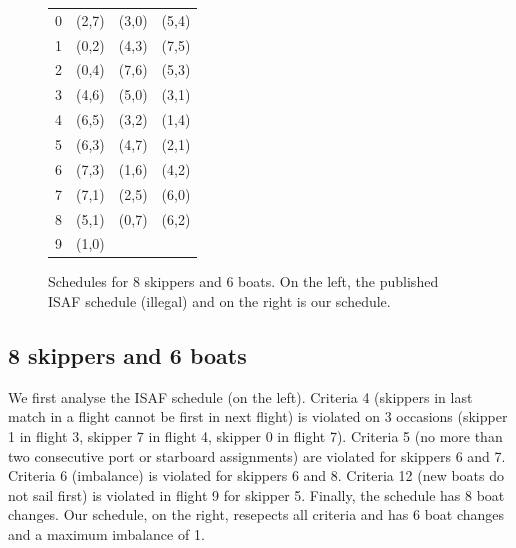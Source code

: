 \documentclass{llncs}
\begin{document}
\begin{center}
\begin{figure}[h]
\begin{minipage}[t]{0.5\textwidth}
\begin{tabular}{cccc}
        0 & (2,7) & (3,0) & (5,4) \\ 
        1 & (0,2)  & (4,3) & (7,5) \\
        2 & (0,4) & (7,6) & (5,3) \\
        3 & (4,6) & (5,0) & (3,1) \\
        4 & (6,5) & (3,2) & (1,4) \\
        5 & (6,3) & (4,7) & (2,1) \\
        6 & (7,3) & (1,6) & (4,2) \\
       7 & (7,1)  & (2,5) & (6,0) \\
       8 & (5,1)  & (0,7) & (6,2) \\
       9 & (1,0)  & & \\ \bottomrule
    \end{tabular}
\label{08-06b}
\end{minipage}
\caption{Schedules for 8 skippers and 6 boats. On the left, the published ISAF schedule (illegal) and on the right is our schedule.}
\label{08-06}
\end{figure}
\end{center}

\noindent
\subsection{8 skippers and 6 boats}
We first analyse the ISAF schedule (on the left). Criteria 4 (skippers in last match in a flight cannot be first in next flight) is violated on 3 occasions (skipper 1 in flight 3, skipper 7 in flight 4, skipper 0 in flight 7). Criteria 5 (no more than two consecutive port or starboard assignments) are violated for skippers 6 and 7. Criteria 6 (imbalance) is violated for skippers 6 and 8. Criteria 12  (new boats do not sail first) is violated in flight 9 for skipper 5. Finally, the schedule has 8 boat changes. Our schedule, on the right, resepects all criteria and has 6 boat changes and a maximum imbalance of 1.
\end{document}
